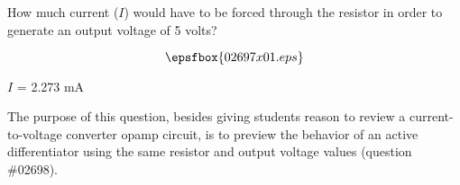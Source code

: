 

How much current ($I$) would have to be forced through the resistor in order to generate an output voltage of 5 volts?

$$\epsfbox{02697x01.eps}$$







$I$ = 2.273 mA







The purpose of this question, besides giving students reason to review a current-to-voltage converter opamp circuit, is to preview the behavior of an active differentiator using the same resistor and output voltage values (question \#02698).




